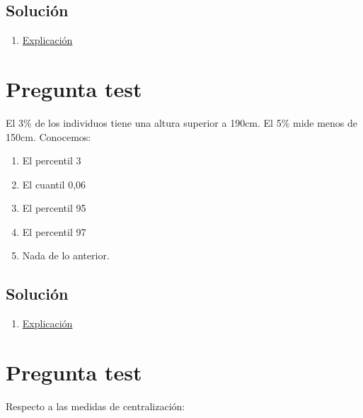 \documentclass[
]{book}
\providecommand{\tightlist}{%
  \setlength{\itemsep}{0pt}\setlength{\parskip}{0pt}}
\begin{document}
\hypertarget{soluciuxf3n-49}{%
\subsection{Solución}\label{soluciuxf3n-49}}

\begin{enumerate}
\def\labelenumi{\alph{enumi})}
\setcounter{enumi}{4}
\tightlist
\item
  \href{https://1fjmanzano.github.io/bioestadistica/tablas-de-frecuencias.html}{Explicación}
\end{enumerate}

\hypertarget{pregunta-test-48}{%
\section{Pregunta test}\label{pregunta-test-48}}

El 3\% de los individuos tiene una altura superior a 190cm. El 5\% mide menos de 150cm. Conocemos:

\begin{enumerate}
\def\labelenumi{\alph{enumi})}
\tightlist
\item
  El percentil 3
\item
  El cuantil 0,06
\item
  El percentil 95
\item
  El percentil 97
\item
  Nada de lo anterior.
\end{enumerate}

\hypertarget{soluciuxf3n-50}{%
\subsection{Solución}\label{soluciuxf3n-50}}

\begin{enumerate}
\def\labelenumi{\alph{enumi})}
\setcounter{enumi}{3}
\tightlist
\item
  \href{https://1fjmanzano.github.io/bioestadistica/medidas-de-posicio\%CC\%81n-dispersio\%CC\%81n-y-forma.html\#medidas-de-posicio\%CC\%81n-no-centrales}{Explicación}
\end{enumerate}

\hypertarget{pregunta-test-49}{%
\section{Pregunta test}\label{pregunta-test-49}}

Respecto a las medidas de centralización:
\end{document}
